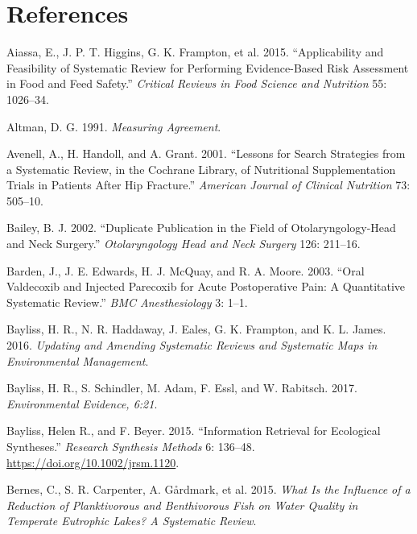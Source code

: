 \documentclass[
  letterpaper,
  DIV=11,
  numbers=noendperiod]{scrreprt}
\newlength{\cslhangindent}
\newenvironment{CSLReferences}[2] %
 {\begin{list}{}{%
  \setlength{\itemindent}{0pt}
  \setlength{\leftmargin}{0pt}
  \setlength{\parsep}{0pt}
  \ifodd #1
   \setlength{\leftmargin}{\cslhangindent}
   \setlength{\itemindent}{-1\cslhangindent}
  \fi
  \setlength{\itemsep}{#2\baselineskip}}}
 {\end{list}}
\begin{document}
\chapter{References}\label{references}

\protect{}\label{refs}
\begin{CSLReferences}{1}{1}
Aiassa, E., J. P. T. Higgins, G. K. Frampton, et al. 2015.
{``Applicability and Feasibility of Systematic Review for Performing
Evidence-Based Risk Assessment in Food and Feed Safety.''}
\emph{Critical Reviews in Food Science and Nutrition} 55: 1026--34.

Altman, D. G. 1991. \emph{Measuring Agreement}.

Avenell, A., H. Handoll, and A. Grant. 2001. {``Lessons for Search
Strategies from a Systematic Review, in the Cochrane Library, of
Nutritional Supplementation Trials in Patients After Hip Fracture.''}
\emph{American Journal of Clinical Nutrition} 73: 505--10.

Bailey, B. J. 2002. {``Duplicate Publication in the Field of
Otolaryngology-Head and Neck Surgery.''} \emph{Otolaryngology Head and
Neck Surgery} 126: 211--16.

Barden, J., J. E. Edwards, H. J. McQuay, and R. A. Moore. 2003. {``Oral
Valdecoxib and Injected Parecoxib for Acute Postoperative Pain: A
Quantitative Systematic Review.''} \emph{BMC Anesthesiology} 3: 1--1.

Bayliss, H. R., N. R. Haddaway, J. Eales, G. K. Frampton, and K. L.
James. 2016. \emph{Updating and Amending Systematic Reviews and
Systematic Maps in Environmental Management}.

Bayliss, H. R., S. Schindler, M. Adam, F. Essl, and W. Rabitsch. 2017.
\emph{Environmental Evidence, 6:21}.

Bayliss, Helen R., and F. Beyer. 2015. {``Information Retrieval for
Ecological Syntheses.''} \emph{Research Synthesis Methods} 6: 136--48.
\url{https://doi.org/10.1002/jrsm.1120}.

Bernes, C., S. R. Carpenter, A. Gårdmark, et al. 2015. \emph{What Is the
Influence of a Reduction of Planktivorous and Benthivorous Fish on Water
Quality in Temperate Eutrophic Lakes? A Systematic Review}.


\end{CSLReferences}
\end{document}
